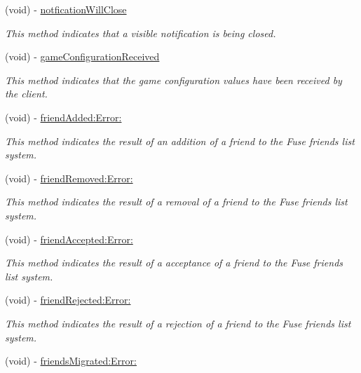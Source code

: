\begin{DoxyCompactItemize}
(void) -\/ \hyperlink{protocol_fuse_delegate-p_ac493f7599268adadcc22e7c508b4ba61}{notfication\+Will\+Close}
\begin{DoxyCompactList}\small\item\em This method indicates that a visible notification is being closed. \end{DoxyCompactList}\item 
(void) -\/ \hyperlink{protocol_fuse_delegate-p_a1da152418e0a5dc2c1b108f501c6e627}{game\+Configuration\+Received}
\begin{DoxyCompactList}\small\item\em This method indicates that the game configuration values have been received by the client. \end{DoxyCompactList}\item 
(void) -\/ \hyperlink{protocol_fuse_delegate-p_a3ec3a11edef788caa05c863ad6255d19}{friend\+Added\+:\+Error\+:}
\begin{DoxyCompactList}\small\item\em This method indicates the result of an addition of a friend to the Fuse friends list system. \end{DoxyCompactList}\item 
(void) -\/ \hyperlink{protocol_fuse_delegate-p_a12d1a890c681d2033be6339ce6e56113}{friend\+Removed\+:\+Error\+:}
\begin{DoxyCompactList}\small\item\em This method indicates the result of a removal of a friend to the Fuse friends list system. \end{DoxyCompactList}\item 
(void) -\/ \hyperlink{protocol_fuse_delegate-p_acf52e0c4576a87e4eb37913206cd9ae3}{friend\+Accepted\+:\+Error\+:}
\begin{DoxyCompactList}\small\item\em This method indicates the result of a acceptance of a friend to the Fuse friends list system. \end{DoxyCompactList}\item 
(void) -\/ \hyperlink{protocol_fuse_delegate-p_a8e0511594bb1f2502700e0fab33ba64a}{friend\+Rejected\+:\+Error\+:}
\begin{DoxyCompactList}\small\item\em This method indicates the result of a rejection of a friend to the Fuse friends list system. \end{DoxyCompactList}\item 
(void) -\/ \hyperlink{protocol_fuse_delegate-p_ac775d9f5c31ecd49516f807847f408d7}{friends\+Migrated\+:\+Error\+:}

\end{DoxyCompactItemize}

